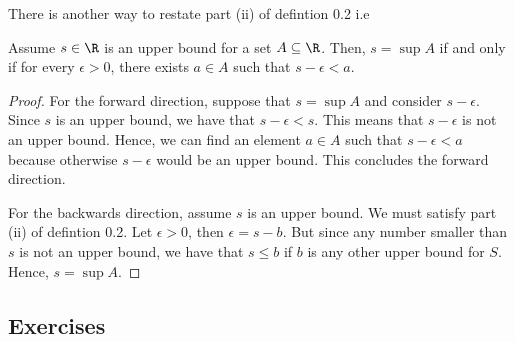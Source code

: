 There is another way to restate part (ii) of defintion 0.2 i.e 
\begin{tcolorbox}
\begin{lem}
Assume \( s \in \R \) is an upper bound for a set \( A \subseteq \R \). Then, \( s = \sup A \) if and only if for every \( \epsilon > 0 \), there exists \( a \in A \) such that \( s - \epsilon < a \).
\end{lem}
\end{tcolorbox}

\begin{proof}
For the forward direction, suppose that \( s = \sup A \) and consider \( s - \epsilon \). Since \( s \) is an upper bound, we have that \( s -\epsilon < s \). This means that \( s - \epsilon \) is not an upper bound. Hence, we can find an element \( a \in A \) such that \( s - \epsilon < a \) because otherwise \( s - \epsilon \) would be an upper bound. This concludes the forward direction.

For the backwards direction, assume \( s \) is an upper bound. We must satisfy part (ii) of defintion 0.2. Let \( \epsilon > 0 \), then \( \epsilon = s - b \). But since any number smaller than \( s \) is not an upper bound, we have that \( s \leq b \) if \( b \) is any other upper bound for \( S \).
Hence, \( s = \sup A \). 
\end{proof}




\subsection{Exercises}





